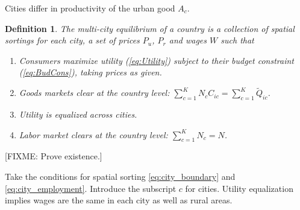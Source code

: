 \documentclass[12pt]{article}
\newtheorem{definition}{Definition}
\begin{document}
Cities differ in productivity of the urban good $A_c$.

\begin{definition}
The multi-city equilibrium of a country is a collection of spatial sortings for each city, a set of prices $P_{u}$, $P_r$ and wages $W$ such that
\begin{enumerate}
    \item Consumers maximize utility (\ref{eq:Utility}) subject to their budget constraint (\ref{eq:BudCons}), taking prices as given.
    \item Goods markets clear at the country level: $\sum_{c=1}^K N_c C_{ic}=\sum_{c=1}^K\tilde Q_{ic}$.
	\item Utility is equalized across cities.
	\item Labor market clears at the country level: $\sum_{c=1}^K N_c = N$.
\end{enumerate}
\end{definition}

[FIXME: Prove existence.]

Take the conditions for spatial sorting \eqref{eq:city_boundary} and \eqref{eq:city_employment}.
Introduce the subscript $c$ for cities. Utility equalization implies wages are the same in each city as well as rural areas.
\end{document}
